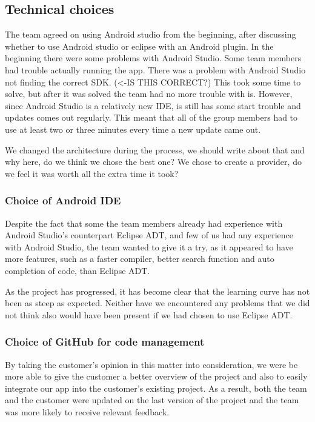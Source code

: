 \subsection{Technical choices}
The team agreed on using Android studio from the beginning, after discussing whether to use Android studio or eclipse with an Android plugin. In the beginning there were some problems with Android Studio. Some team members had trouble actually running the app. There was a problem with Android Studio not finding the correct SDK. (<-IS THIS CORRECT?) This took some time to solve, but after it was solved the team had no more trouble with is. However, since Android Studio is a relatively new IDE, is still has some start trouble and updates comes out regularly. This meant that all of the group members had to use at least two or three minutes every time a new update came out. 

We changed the architecture during the process, we should write about that and why here, do we think we chose the best one? We chose to create a provider, do we feel it was worth all the extra time it took? 

\subsubsection{Choice of Android IDE}
Despite the fact that some the team members already had experience with Android Studio's counterpart Eclipse ADT, and few of us had any experience with Android Studio, the team wanted to give it a try, as it appeared to have more features, such as a faster compiler, better search function and auto completion of code, than Eclipse ADT. 

As the project has progressed, it has become clear that the learning curve has not been as steep as expected. Neither have we encountered any problems that we did not think also would have been present if we had chosen to use Eclipse ADT.

\subsubsection{Choice of GitHub for code management}
By taking the customer's opinion in this matter into consideration, we were be more able to give the customer a better overview of the project and also to easily integrate our app into the customer's existing project. As a result, both the team and the customer were updated on the last version of the project and the team was more likely to receive relevant feedback. 

